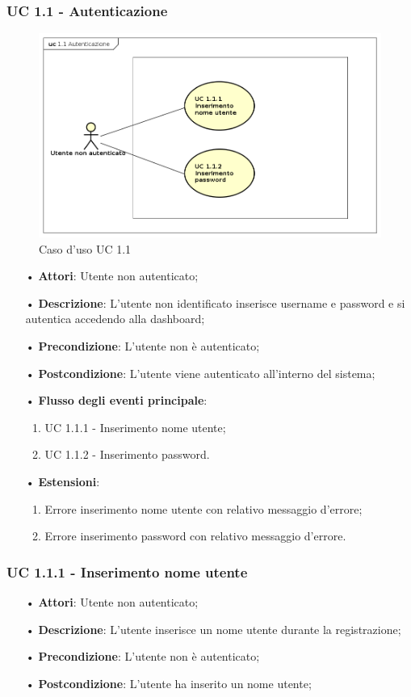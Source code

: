 \subsubsection{UC 1.1 - Autenticazione}
\begin{figure}[H]
\centering
\includegraphics[width=17cm]{img/UC11.png} 
\caption{Caso d'uso UC 1.1}\label{fig:11}
\end{figure}
\begin{itemize}
\item[•]\textbf{Attori}: Utente non autenticato;
\item[•]\textbf{Descrizione}:  L’utente non identificato inserisce username e password e si autentica accedendo alla dashboard;
\item[•]\textbf{Precondizione}: L’utente non è autenticato;
\item[•]\textbf{Postcondizione}: L’utente viene autenticato all’interno del sistema;
\item[•]\textbf{Flusso degli eventi principale}:
\begin{enumerate}
\item UC 1.1.1 - Inserimento nome utente;
\item UC 1.1.2 - Inserimento password.
\end{enumerate}
\item[•]\textbf{Estensioni}:
\begin{enumerate}
\item Errore inserimento nome utente con relativo messaggio d’errore;
\item Errore inserimento password con relativo messaggio d’errore.
\end{enumerate}
\end{itemize}

\subsubsection{UC 1.1.1 - Inserimento nome utente}
\begin{itemize}
\item[•]\textbf{Attori}: Utente non autenticato;
\item[•]\textbf{Descrizione}: L’utente inserisce un nome utente durante la registrazione;
\item[•]\textbf{Precondizione}: L’utente non è autenticato;
\item[•]\textbf{Postcondizione}: L’utente ha inserito un nome utente;
\end{itemize}

